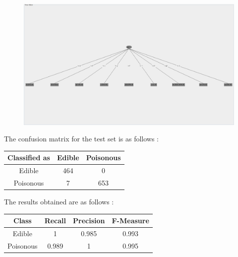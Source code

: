 \documentclass[paper=a4, fontsize=11pt]{scrartcl}
\numberwithin{equation}{section}		%
\numberwithin{figure}{section}			%
\numberwithin{table}{section}				%
\begin{document}
\begin{figure}[H]
\begin{center}
\graphicspath{ {../EE15B025_PA2/Code/q5/Trees/} }
\includegraphics[scale=0.25]{cross_valid_100_rp}
\end{center}
\end{figure}

The confusion matrix for the test set is as follows :\\
\begin{table}[H]
\label{T:equipos}
\begin{center}
\begin{tabular}{| c | c | c |}
\hline
\textbf{Classified as} & \textbf{Edible} & \textbf{Poisonous} \\ 
\hline

Edible & 464  & 0 \\ \hline
Poisonous & 7 & 653 \\ \hline

\end{tabular}
\end{center}
\end{table}

The results obtained are as follows :\\
\begin{table}[H]
\label{T:equipos}
\begin{center}
\begin{tabular}{| c | c | c | c |}
\hline
\textbf{Class} & \textbf{Recall} & \textbf{Precision} & \textbf{F-Measure}\\ 
\hline

Edible & 1  & 0.985  & 0.993 \\ \hline
Poisonous & 0.989  & 1 & 0.995 \\ \hline

\end{tabular}
\end{center}
\end{table}
\end{document}

